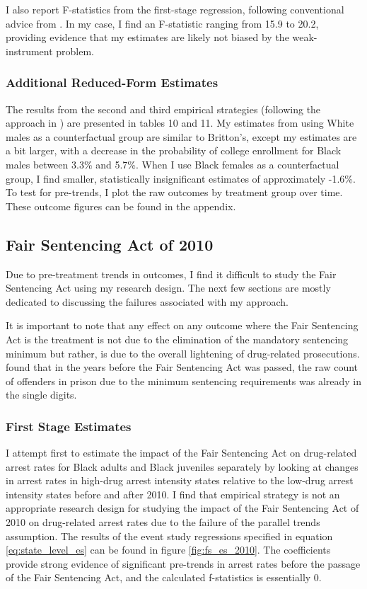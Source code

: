 \documentclass{article}
\begin{document}
I also report F-statistics from the first-stage regression, following conventional advice from \cite{staiger1997precise}. In my case, I find an F-statistic ranging from 15.9 to 20.2, providing evidence that my estimates are likely not biased by the weak-instrument problem.

\subsubsection{Additional Reduced-Form Estimates}

The results from the second and third empirical strategies (following the approach in \cite{britton2022}) are presented in tables 10 and 11. My estimates from using White males as a counterfactual group are similar to Britton's, except my estimates are a bit larger, with a decrease in the probability of college enrollment for Black males between 3.3\% and 5.7\%. When I use Black females as a counterfactual group, I find smaller, statistically insignificant estimates of approximately -1.6\%. To test for pre-trends, I plot the raw outcomes by treatment group over time. These outcome figures can be found in the appendix.

\subsection{Fair Sentencing Act of 2010}

Due to pre-treatment trends in outcomes, I find it difficult to study the Fair Sentencing Act using my research design. The next few sections are mostly dedicated to discussing the failures associated with my approach.

It is important to note that any effect on any outcome where the Fair Sentencing Act is the treatment is not due to the elimination of the mandatory sentencing minimum but rather, is due to the overall lightening of drug-related prosecutions. \cite{ussc} found that in the years before the Fair Sentencing Act was passed, the raw count of offenders in prison due to the minimum sentencing requirements was already in the single digits.

\subsubsection{First Stage Estimates}

I attempt first to estimate the impact of the Fair Sentencing Act on drug-related arrest rates for Black adults and Black juveniles separately by looking at changes in arrest rates in high-drug arrest intensity states relative to the low-drug arrest intensity states before and after 2010. I find that empirical strategy is not an appropriate research design for studying the impact of the Fair Sentencing Act of 2010 on drug-related arrest rates due to the failure of the parallel trends assumption. The results of the event study regressions specified in equation \ref{eq:state_level_es} can be found in figure \ref{fig:fs_es_2010}. The coefficients provide strong evidence of significant pre-trends in arrest rates before the passage of the Fair Sentencing Act, and the calculated f-statistics is essentially 0.
\end{document}
